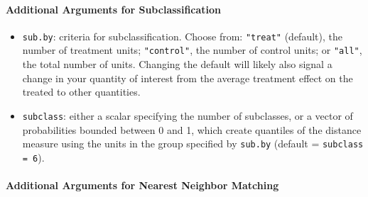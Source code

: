 \paragraph{Additional Arguments for Subclassification}
\label{subsubsec:inputs-subclass}

\begin{itemize}
\item \texttt{sub.by}: criteria for subclassification.  Choose from:
  \texttt{"treat"} (default), the number of treatment units;
  \texttt{"control"}, the number of control units; or \texttt{"all"},
  the total number of units.  Changing the default will likely also
  signal a change in your quantity of interest from the average
  treatment effect on the treated to other quantities.
\item \texttt{subclass}: either a scalar specifying the number of
  subclasses, or a vector of probabilities bounded between 0 and 1,
  which create quantiles of the distance measure using the units in
  the group specified by \texttt{sub.by} (default = \texttt{subclass =
    6}).  
\end{itemize}

\paragraph{Additional Arguments for Nearest Neighbor Matching}
\label{subsubsec:inputs-nearest}

